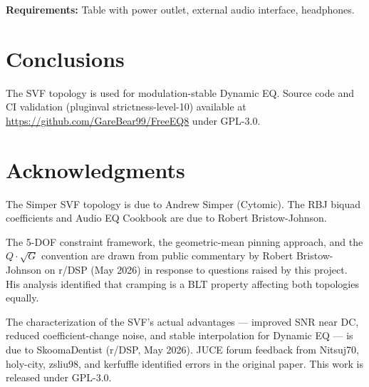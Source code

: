 \documentclass[10pt,twocolumn,a4paper]{article}
\begin{document}
\textbf{Requirements:} Table with power outlet, external audio interface, headphones.

\section{Conclusions}
The SVF topology is used for modulation-stable Dynamic EQ. Source code and CI validation (pluginval strictness-level-10) available at \url{https://github.com/GareBear99/FreeEQ8} under GPL-3.0.

\section{Acknowledgments}
The Simper SVF topology is due to Andrew Simper (Cytomic). The RBJ biquad coefficients and Audio EQ Cookbook are due to Robert Bristow-Johnson.

The 5-DOF constraint framework, the geometric-mean pinning approach, and the $Q\cdot\sqrt{G}$ convention are drawn from public commentary by Robert Bristow-Johnson on r/DSP (May 2026) in response to questions raised by this project. His analysis identified that cramping is a BLT property affecting both topologies equally.

The characterization of the SVF's actual advantages --- improved SNR near DC, reduced coefficient-change noise, and stable interpolation for Dynamic EQ --- is due to SkoomaDentist (r/DSP, May 2026). JUCE forum feedback from Nitsuj70, holy-city, zsliu98, and kerfuffle identified errors in the original paper. This work is released under GPL-3.0.
\end{document}
